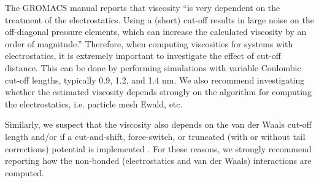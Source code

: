 \documentclass[9pt,bestpractices]{livecoms}
\begin{document}
The GROMACS manual reports that viscosity ``is very dependent on the treatment of the electrostatics. Using a (short) cut-off results in large noise on the off-diagonal pressure elements, which can increase the calculated viscosity by an order of magnitude.'' \cite{GROMACS,Hess2002} Therefore, when computing viscosities for systems with electrostatics, it is extremely important to investigate the effect of cut-off distance. This can be done by performing simulations with variable Coulombic cut-off lengths, typically 0.9, 1.2, and 1.4 nm. We also recommend investigating whether the estimated viscosity depends strongly on the algorithm for computing the electrostatics, i.e. particle mesh Ewald, etc. \cite{GROMACS} 

Similarly, we suspect that the viscosity also depends on the van der Waals cut-off length and/or if a cut-and-shift, force-switch, or truncated (with or without tail corrections) potential is implemented \cite{GROMACS}. For these reasons, we strongly recommend reporting how the non-bonded (electrostatics and van der Waals) interactions are computed. 
\end{document}

